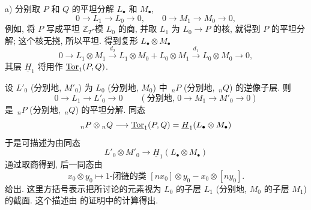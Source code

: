 \medskip
\noindent a) 分别取 $P$ 和 $Q$ 的平坦分解 $L_\bullet$ 和 $M_\bullet$,
\[
 0\longrightarrow L_1\longrightarrow L_0\longrightarrow0,
 \qquad
 0\longrightarrow M_1\longrightarrow M_0\longrightarrow0,
\]
例如, 将 $P$ 写成平坦 $\mathbb Z_T$-模 $L_0$ 的商, 并取 $L_1$ 为 $L_0\longrightarrow P$ 的核, 就得到 $P$ 的平坦分解; 这个核无挠, 所以平坦. 得到复形 $L_\bullet\otimes M_\bullet$
\[
 0\longrightarrow L_1\otimes M_1
 \xrightarrow{d_2}
 L_1\otimes M_0+L_0\otimes M_1
 \xrightarrow{d_1}
 L_0\otimes M_0
 \longrightarrow0,
\]
其层 $\underline H_1$ 将用作 $\uTor_1(P,Q)$.

设 $L'_0$ (分别地, $M'_0$) 为 $L_0$ (分别地, $M_0$) 中 $\,{}_nP$ (分别地, $\,{}_nQ$) 的逆像子层. 则
\[
 0\longrightarrow L_1\longrightarrow L'_0\longrightarrow0
 \qquad
 \left(\text{分别地, }
 0\longrightarrow M_1\longrightarrow M'_0\longrightarrow0\right)
\]
是 $\,{}_nP$ (分别地, $\,{}_nQ$) 的平坦分解. 同态
\[
 {}_nP\otimes{}_nQ
 \longrightarrow
 \uTor_1(P,Q)=\underline H_1(L_\bullet\otimes M_\bullet)
\]
于是可描述为由同态
\[
 L'_0\otimes M'_0
 \longrightarrow
 \underline H_1(L_\bullet\otimes M_\bullet)
\]
通过取商得到, 后一同态由
\[
 x_0\otimes y_0
 \longmapsto
 \text{$1$-闭链的类 }
 [nx_0]\otimes y_0-x_0\otimes[ny_0].
\]
给出. 这里方括号表示把所讨论的元素视为 $L_0$ 的子层 $L_1$ (分别地, $M_0$ 的子层 $M_1$) 的截面. 这个描述由  的证明中的计算得出.

